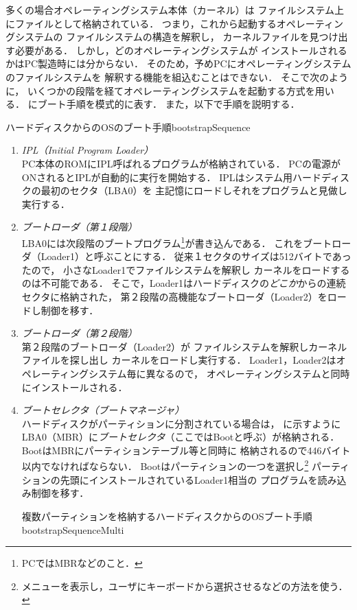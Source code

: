 多くの場合オペレーティングシステム本体（カーネル）は
ファイルシステム上にファイルとして格納されている．
つまり，これから起動するオペレーティングシステムの
ファイルシステムの構造を解釈し，
カーネルファイルを見つけ出す必要がある．
しかし，どのオペレーティングシステムが
インストールされるかはPC製造時には分からない．
そのため，予めPCにオペレーティングシステムのファイルシステムを
解釈する機能を組込むことはできない．
そこで次のように，
いくつかの段階を経てオペレーティングシステムを起動する方式を用いる．
にブート手順を模式的に表す．
また，以下で手順を説明する．

           {ハードディスクからのOSのブート手順}{bootstrapSequence}

\begin{enumerate}
\item \emph{IPL（Initial Program Loader）} \\
  PC本体のROMにIPL呼ばれるプログラムが格納されている．
  PCの電源がONされるとIPLが自動的に実行を開始する．
  IPLはシステム用ハードディスクの最初のセクタ（LBA0）を
  主記憶にロードしそれをプログラムと見做し実行する．
\item \emph{ブートローダ（第１段階）} \\
  LBA0には次段階のブートプログラム\footnote{
    PCではMBRなどのこと．}が書き込んである．
  これをブートローダ（Loader1）と呼ぶことにする．
  従来１セクタのサイズは512バイトであったので，
  小さなLoader1でファイルシステムを解釈し
  カーネルをロードするのは不可能である．
  そこで，Loader1はハードディスクの\emph{どこか}からの連続セクタに格納された，
  第２段階の高機能なブートローダ（Loader2）をロードし制御を移す．
\item \emph{ブートローダ（第２段階）} \\
  第２段階のブートローダ（Loader2）が
  ファイルシステムを解釈しカーネルファイルを探し出し
  カーネルをロードし実行する．
  Loader1，Loader2はオペレーティングシステム毎に異なるので，
  オペレーティングシステムと同時にインストールされる．
\item  \emph{ブートセレクタ（ブートマネージャ）} \\
  ハードディスクがパーティションに分割されている場合は，
  に示すように
  LBA0（MBR）に\emph{ブートセレクタ}（ここではBootと呼ぶ）が格納される．
  BootはMBRにパーティションテーブル等と同時に
  格納されるので446バイト以内でなければならない．
  Bootはパーティションの一つを選択し\footnote{
    メニューを表示し，ユーザにキーボードから選択させるなどの方法を使う．}
  パーティションの先頭にインストールされているLoader1相当の
  プログラムを読み込み制御を移す．

           {複数パーティションを格納するハードディスクからのOSブート手順}
           {bootstrapSequenceMulti}

\end{enumerate}

